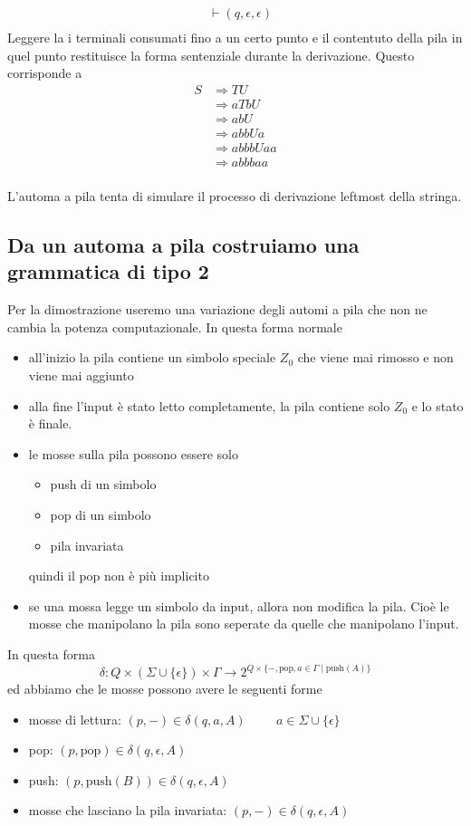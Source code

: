 \documentclass[12pt]{article}
\begin{document}
\begin{tcolorbox}[breakable]
\begin{align*}
		               &\vdash (q, \epsilon, \epsilon) \\
	\end{align*}
	Leggere la i terminali consumati fino a un certo punto e il contentuto della pila in quel punto restituisce la forma sentenziale durante la derivazione.
	Questo corrisponde a
	\begin{align*}
		S &\Rightarrow T U \\
		  &\Rightarrow a T b U \\
		  &\Rightarrow a b U \\
		  &\Rightarrow a b b U a \\
		  &\Rightarrow a b b b U a a \\
		  &\Rightarrow a b b b a a \\
	\end{align*}
\end{tcolorbox}
L'automa a pila tenta di simulare il processo di derivazione leftmost della stringa.

\subsection{Da un automa a pila costruiamo una grammatica di tipo 2}
Per la dimostrazione useremo una variazione degli automi a pila che non ne cambia la potenza computazionale.
In questa forma normale
\begin{itemize}
	\item all'inizio la pila contiene un simbolo speciale $Z_0$ che viene mai rimosso e non viene mai aggiunto
	\item alla fine l'input è stato letto completamente, la pila contiene solo $Z_0$ e lo stato è finale.
	\item le mosse sulla pila possono essere solo
		\begin{itemize}
			\item push di un simbolo
			\item pop di un simbolo
			\item pila invariata
		\end{itemize}
		quindi il pop non è più implicito
	\item se una mossa legge un simbolo da input, allora non modifica la pila. 
		Cioè le mosse che manipolano la pila sono seperate da quelle che manipolano l'input.
\end{itemize}
In questa forma
$$ \delta : Q \times (\Sigma \cup \{\epsilon\}) \times \Gamma \rightarrow 2^{Q \times \{-, \text{pop}, a \in \Gamma \mid \text{push}(A)\}} $$
ed abbiamo che le mosse possono avere le seguenti forme
\begin{itemize}
	\item mosse di lettura: $ (p, -) \in \delta(q, a, A) \hspace{1cm} a \in \Sigma \cup \{\epsilon\} $
	\item pop: $(p, \text{pop}) \in \delta(q, \epsilon , A) $
	\item push: $(p, \text{push}(B)) \in \delta(q, \epsilon , A) $
	\item mosse che lasciano la pila invariata: $(p, -) \in \delta(q, \epsilon , A) $
\end{itemize}
\end{document}
